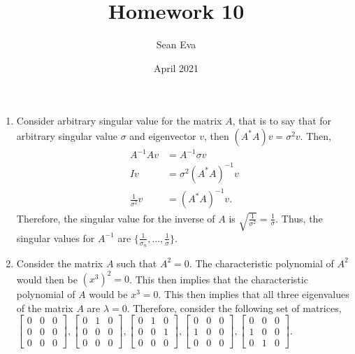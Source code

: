 \documentclass{article}
\title{Homework 10}
\author{Sean Eva}
\date{April 2021}
\begin{document}
\maketitle

\begin{enumerate}
    \item 
    
    Consider arbitrary singular value for the matrix $A$, that is to say that for arbitrary singular value $\sigma$ and eigenvector $v$, then $(A^*A)v=\sigma^2 v$. Then,
    \begin{align*}
        A^{-1}Av&=A^{-1}\sigma v\\
        Iv&=\sigma^2(A^*A)^{-1}v\\
        \frac{1}{\sigma^2}v&=(A^*A)^{-1}v.
    \end{align*} Therefore, the singular value for the inverse of $A$ is $\sqrt{\frac{1}{\sigma^2}}=\frac{1}{\sigma}$. Thus, the singular values for $A^{-1}$ are $\{\frac{1}{\sigma_n}, ..., \frac{1}{\sigma}\}$.
    
    \item
    
    Consider the matrix $A$ such that $A^2=0$. The characteristic polynomial of $A^2$ would then be $(x^3)^2=0$. This then implies that the characteristic polynomial of $A$ would be $x^3=0$. This then implies that all three eigenvalues of the matrix $A$ are $\lambda=0$. Therefore, consider the following set of matrices, $\begin{bmatrix}
    0 & 0 & 0\\
    0 & 0 & 0\\
    0 & 0 & 0
    \end{bmatrix},
    \begin{bmatrix}
    0 & 1 & 0\\
    0 & 0 & 0\\
    0 & 0 & 0
    \end{bmatrix},
    \begin{bmatrix}
    0 & 1 & 0\\
    0 & 0 & 1\\
    0 & 0 & 0
    \end{bmatrix},
    \begin{bmatrix}
    0 & 0 & 0\\
    1 & 0 & 0\\
    0 & 0 & 0
    \end{bmatrix},
    \begin{bmatrix}
    0 & 0 & 0\\
    1 & 0 & 0\\
    0 & 1 & 0
    \end{bmatrix}.$
    

\end{enumerate}
\end{document}
